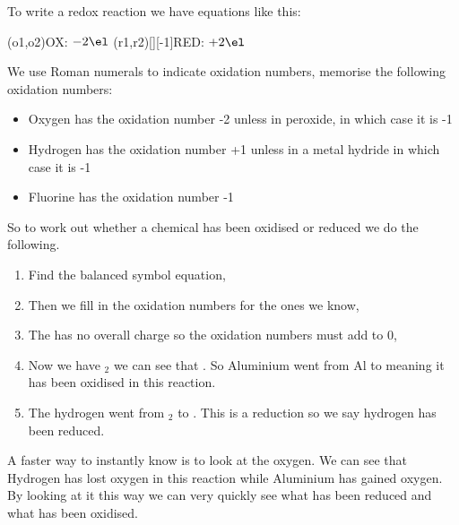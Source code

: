 \documentclass[11pt,a4paper]{memoir}
\begin{document}
	To write a redox reaction we have equations like this:
	\begin{center}
	\vspace{7mm}
	\redox(o1,o2){\small OX: $- 2\el$}
	\redox(r1,r2)[][-1]{\small RED: $+ 2\el$}
	\vspace{7mm}
	\end{center}
	We use Roman numerals to indicate oxidation numbers, memorise the following oxidation numbers:
	\begin{itemize}
		\item Oxygen has the oxidation number -2 unless in peroxide, in which case it is -1
		\item Hydrogen has the oxidation number +1 unless in a metal hydride in which case it is -1
		\item Fluorine has the oxidation number -1
	\end{itemize}
	So to work out whether a chemical has been oxidised or reduced we do the following.
	
	\begin{enumerate}
		\item Find the balanced symbol equation,
		
		
		\item Then we fill in the oxidation numbers for the ones we know,
		
		 
		\item The  has no overall charge so the oxidation numbers must add to 0,
		
		
		\item Now we have $_2$ we can see that . So Aluminium went from Al to  meaning it has been oxidised in this reaction.
		
		\item The hydrogen went from $_2$ to . This is a reduction so we say hydrogen has been reduced.
	\end{enumerate}
	
	A faster way to instantly know is to look at the oxygen. We can see that Hydrogen has lost oxygen in this reaction while Aluminium has gained oxygen. By looking at it this way we can very quickly see what has been reduced and what has been oxidised.
	
\end{document}
